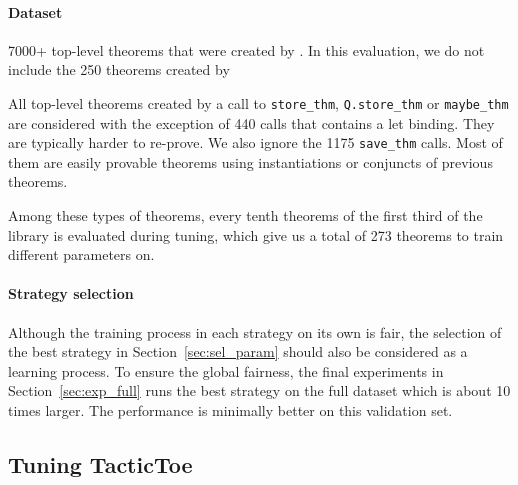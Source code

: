 \documentclass[runningheads,a4paper,draft]{svjour3}
\def\eprover{\textsf{E-prover}\xspace}
\def\tactictoe{\textsf{TacticToe}\xspace}
\begin{document}
\paragraph{Dataset}

7000+ top-level theorems that were created by . 
In this evaluation, we do not include the 250 theorems created by

All top-level theorems created by a call to 
\texttt{store\_thm}, 
\texttt{Q.store\_thm} or \texttt{maybe\_thm} are considered with the exception 
of 440 calls that contains a let binding. They are typically harder to re-prove.
We also ignore the 1175 \texttt{save\_thm} calls. Most of them are easily 
provable theorems using instantiations or conjuncts of previous 
theorems.


Among these types of theorems, every tenth theorems of the first third of the 
library is evaluated during tuning, which give us a total of 273 theorems to 
train different parameters on.

\paragraph{Strategy selection}
Although the training process in each strategy on its own is fair, the 
selection of the 
best strategy in Section~\ref{sec:sel_param} should also be considered as a 
learning 
process. To ensure the global fairness, the final experiments in 
Section~\ref{sec:exp_full} 
runs the best strategy on the full dataset which is about 10 times larger. The
performance is minimally better on this validation set.

\subsection{Tuning \tactictoe}
\end{document}
